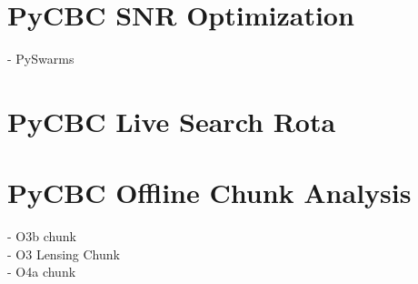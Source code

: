 \section{PyCBC SNR Optimization}
- PySwarms

\section{PyCBC Live Search Rota}

\section{PyCBC Offline Chunk Analysis}
- O3b chunk \\
- O3 Lensing Chunk \\
- O4a chunk \
